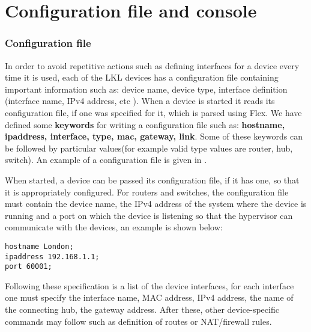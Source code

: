 {{\section{Configuration file and console}
\label{sec:config}

\subsubsection{Configuration file}
\label{subsec:config-file}
In order to avoid repetitive actions such as defining interfaces for a device every time it is used, each 
of the LKL devices has a configuration file containing important information such as: device name, 
device type, interface definition (interface name, IPv4 address, etc ). When a device is started it 
reads its configuration file, if one was specified for it, which is parsed using Flex. We have defined some 
\textbf{keywords} for writing a configuration file such as: \textbf{hostname, ipaddress, 
interface, type, mac, gateway, link}. Some of these keywords can be followed by 
particular values(for example valid type values are router, hub, switch). An example of a 
configuration file is given in .

When started, a device can be passed its configuration file, if it has one, 
so that it is appropriately configured. For routers and switches, the configuration 
file must contain the device name, the IPv4 address of the system where the device is running and a port 
on which the device is listening so that the hypervisor can communicate with the devices, an example is shown below:
\lstset{language=TeX,caption=Fields of Configuration File,label=lst:config-file}
\begin{lstlisting}
hostname London;
ipaddress 192.168.1.1;
port 60001;
\end{lstlisting}
Following these specification is a list of the device interfaces, for each interface one must specify 
the interface name, MAC address, IPv4 address, the name of the connecting hub, the gateway address. 
After these, other device-specific commands may follow such as definition of routes or NAT/firewall rules.

}}
